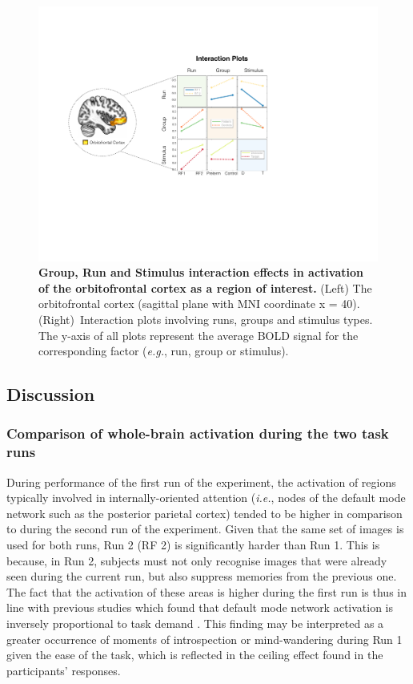 \begin{figure}[h]
\centering\includegraphics[width=1\linewidth]{images/Ch4/Ch4_ROI_Interactions.pdf}
\caption{\textbf{Group, Run and Stimulus interaction effects in activation of the orbitofrontal cortex as a region of interest.} (Left) The orbitofrontal cortex (sagittal plane with MNI coordinate x = 40). (Right)~Interaction plots involving runs, groups and stimulus types. The y-axis of all plots represent the average BOLD signal for the corresponding factor (\textit{e.g.}, run, group or stimulus). } \label{fig:ch4_ROI_Interactions}
\end{figure} 







\subsection{Discussion}

\subsubsection{Comparison of whole-brain activation during the two task runs}

 During performance of the first run of the experiment, the activation of regions typically involved in internally-oriented attention (\textit{i.e.}, nodes of the default mode network such as the posterior parietal cortex) tended to be higher in comparison to during the second run of the experiment. Given that the same set of images is used for both runs, Run 2 (RF 2) is significantly harder than Run 1. This is because, in Run 2, subjects must not only recognise images that were already seen during the current run, but also suppress memories from the previous one. The fact that the activation of these areas is higher during the first run is thus in line with previous studies which found that default mode network activation is inversely proportional to task demand \citep{Ceko2015}. This finding may be interpreted as a greater occurrence of moments of introspection or mind-wandering during Run 1 given the ease of the task, which is reflected in the ceiling effect found in the participants' responses.


